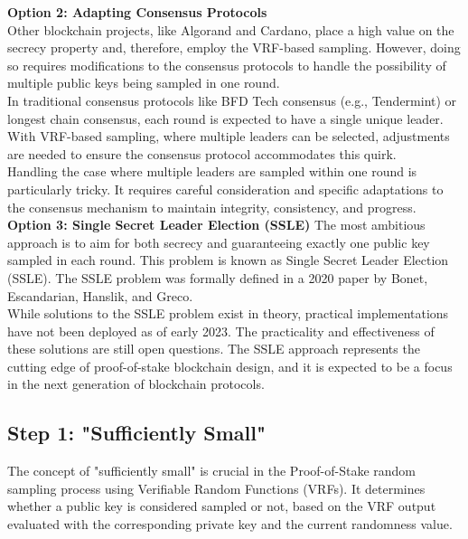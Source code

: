 \noindent
\textbf{Option 2: Adapting Consensus Protocols}\\
Other blockchain projects, like Algorand and Cardano, place a high value on the secrecy property and, therefore, employ the VRF-based sampling. However, doing so requires modifications to the consensus protocols to handle the possibility of multiple public keys being sampled in one round.\\
In traditional consensus protocols like BFD Tech consensus (e.g., Tendermint) or longest chain consensus, each round is expected to have a single unique leader. With VRF-based sampling, where multiple leaders can be selected, adjustments are needed to ensure the consensus protocol accommodates this quirk.\\
Handling the case where multiple leaders are sampled within one round is particularly tricky. It requires careful consideration and specific adaptations to the consensus mechanism to maintain integrity, consistency, and progress.\\

\noindent
\textbf{Option 3: Single Secret Leader Election (SSLE)}
The most ambitious approach is to aim for both secrecy and guaranteeing exactly one public key sampled in each round. This problem is known as Single Secret Leader Election (SSLE). The SSLE problem was formally defined in a 2020 paper by Bonet, Escandarian, Hanslik, and Greco.\\
While solutions to the SSLE problem exist in theory, practical implementations have not been deployed as of early 2023. The practicality and effectiveness of these solutions are still open questions. The SSLE approach represents the cutting edge of proof-of-stake blockchain design, and it is expected to be a focus in the next generation of blockchain protocols.

\subsection{Step 1: "Sufficiently Small"}
The concept of "sufficiently small" is crucial in the Proof-of-Stake random sampling process using Verifiable Random Functions (VRFs). It determines whether a public key is considered sampled or not, based on the VRF output evaluated with the corresponding private key and the current randomness value.

